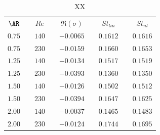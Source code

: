 \begin{table}
  \begin{center}
  \begin{tabular}{ccccccccc}
    $\AR$  & & $Re$  & & $\Re(\sigma)$ & & $St_{lin}$ & & $St_{nl}$ \\
    $0.75$ & & $140$ & & $-0.0065$  & & $0.1612$   & & $0.1616$  \\
    $0.75$ & & $230$ & & $-0.0159$  & & $0.1660$   & & $0.1653$  \\
    $1.25$ & & $140$ & & $-0.0134$  & & $0.1517$   & & $0.1519$  \\
    $1.25$ & & $230$ & & $-0.0393$  & & $0.1360$   & & $0.1350$  \\
    $1.50$ & & $140$ & & $-0.0126$  & & $0.1502$   & & $0.1512$  \\
    $1.50$ & & $230$ & & $-0.0394$  & & $0.1647$   & & $0.1625$  \\
    $2.00$ & & $140$ & & $-0.0037$  & & $0.1465$   & & $0.1483$  \\
    $2.00$ & & $230$ & & $-0.0124$  & & $0.1744$   & & $0.1695$  \\
  \end{tabular} 
  \caption{XX}
  \label{tab:eigs}
  \end{center}  
\end{table}
%
